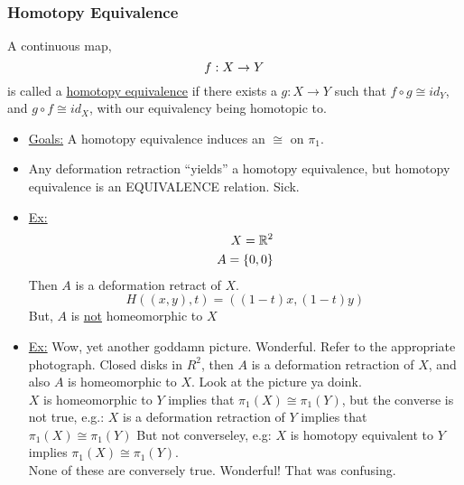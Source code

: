 \documentclass[../notes.tex]{subfiles}
\begin{document}
\subsubsection{Homotopy Equivalence}
\begin{definition}
    A continuous map,
    \[
        f: X\rightarrow Y\\
    \]
    is called a \underline{homotopy equivalence} if there exists a $g:X\rightarrow Y$ such
    that $f\circ g\cong id_Y$, and $g\circ f \cong id_X$, with our equivalency being
    homotopic to.
\end{definition}
\begin{itemize}
    \item \underline{Goals:} A homotopy equivalence induces an $\cong$ on $\pi_1$.
    \item Any deformation retraction ``yields'' a homotopy equivalence, but homotopy
        equivalence is an EQUIVALENCE relation. Sick.
    \item \underline{Ex:}
        \begin{align*}
            X=\mathbb{R}^2\\
            A=\{0,0\}\\
        \end{align*}
        Then $A$ is a deformation retract of $X$.
        \[
            H((x,y),t)=((1-t)x,(1-t)y)
        \]
        But, $A$ is \underline{not} homeomorphic to $X$
    \item \underline{Ex:}
        Wow, yet another goddamn picture. Wonderful. Refer to the appropriate photograph.
        Closed disks in $R^2$, then $A$ is a deformation retraction of $X$, and also
        $A$ is homeomorphic to $X$. Look at the picture ya doink.\\
        $X$ is homeomorphic to $Y$ implies that $\pi_1(X)\cong\pi_1(Y)$, but the
        converse is not true, e.g.:
        $X$ is a deformation retraction of $Y$ implies that $\pi_1(X)\cong \pi_1(Y)$
        But not converseley, e.g:
        $X$ is homotopy equivalent to $Y$ implies $\pi_1(X)\cong \pi_1(Y)$.\\
        None of these are conversely true. Wonderful! That was confusing.
\end{itemize}
\end{document}
